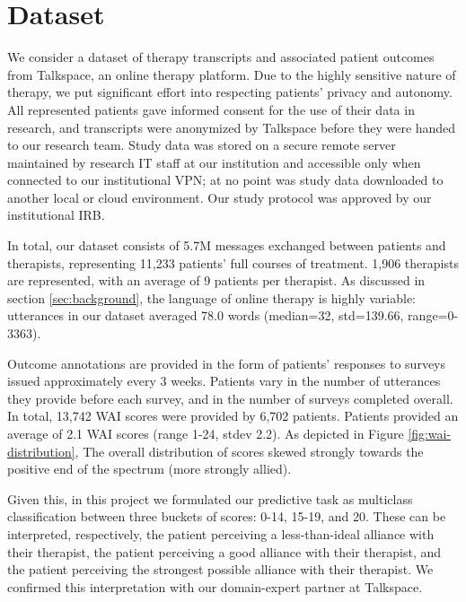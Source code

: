 \documentclass{article}
\begin{document}
\section{Dataset}
\label{sec:dataset}

We consider a dataset of therapy transcripts and associated patient outcomes from Talkspace, an online therapy platform. Due to the highly sensitive nature of therapy, we put significant effort into respecting patients' privacy and autonomy. All represented patients gave informed consent for the use of their data in research, and transcripts were anonymized by Talkspace before they were handed to our research team. Study data was stored on a secure remote server maintained by research IT staff at our institution and accessible only when connected to our institutional VPN; at no point was study data downloaded to another local or cloud environment. Our study protocol was approved by our institutional IRB.

In total, our dataset consists of 5.7M messages exchanged between patients and therapists, representing 11,233 patients' full courses of treatment. 1,906 therapists are represented, with an average of 9 patients per therapist. As discussed in section \ref{sec:background}, the language of online therapy is highly variable: utterances in our dataset averaged 78.0 words (median=32, std=139.66, range=0-3363).

Outcome annotations are provided in the form of patients' responses to surveys issued approximately every 3 weeks. Patients vary in the number of utterances they provide before each survey, and in the number of surveys completed overall. In total, 13,742 WAI scores were provided by 6,702 patients. Patients provided an average of 2.1 WAI scores (range 1-24, stdev 2.2). As depicted in Figure \ref{fig:wai-distribution}, The overall distribution of scores skewed strongly towards the positive end of the spectrum (more strongly allied). 

Given this, in this project we formulated our predictive task as multiclass classification between three buckets of scores: 0-14, 15-19, and 20. These can be interpreted, respectively, the patient perceiving a less-than-ideal alliance with their therapist, the patient perceiving a good alliance with their therapist, and the patient perceiving the strongest possible alliance with their therapist. We confirmed this interpretation with our domain-expert partner at Talkspace.
\end{document}
